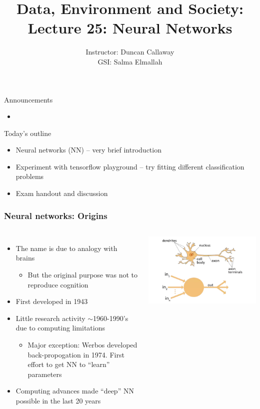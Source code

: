 \documentclass[mathserif, aspectratio=169]{beamer}
\title[Lecture 25] 
{Data, Environment and Society: \\{Lecture 25: Neural Networks}}
\author[ER131: Data, Environment and Society] 
{Instructor: Duncan Callaway\\
GSI: Salma Elmallah}
\institute[UC Berkeley] %
 {\small{ \bf November 26, 2019}}
\date[November 26, 2019]
\begin{document}
\frame{
	\titlepage
}


\begin{frame}{Announcements}
	\begin{itemize}
		\item 
	\end{itemize}
\end{frame}


\begin{frame}{Today's outline}
	\begin{itemize}
		\item Neural networks (NN) -- very brief introduction
		\item Experiment with tensorflow playground -- try fitting different classification problems
		\item Exam handout and discussion
	\end{itemize}
\end{frame}


\begin{frame}
	\frametitle{Neural networks: Origins}
	\begin{columns}[c]
			\begin{itemize}
				\item The name is due to analogy with brains
				\begin{itemize}
					\item But the original purpose was not to reproduce cognition
				\end{itemize}
				\item First developed in 1943
				\item Little research activity $\sim$1960-1990's due to computing limitations
				\begin{itemize}
					\item Major exception: Werbos developed back-propogation in 1974.  First effort to get NN to ``learn'' parameters
				\end{itemize}
				\item Computing advances made ``deep'' NN possible in the last 20 years
			\end{itemize}
			\includegraphics[width=\textwidth]{nn_v_ann}
	\end{columns}
\end{frame}
\end{document}
